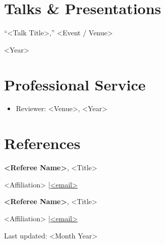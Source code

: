\documentclass[11pt,a4paper]{article}
\newcommand{\entry}[2]{%
  \noindent\begin{minipage}[t]{0.80\textwidth}#1\end{minipage}%
  \hfill\begin{minipage}[t]{0.19\textwidth}\raggedleft #2\end{minipage}\par}
\begin{document}
\section{Talks \& Presentations}
\entry{``<Talk Title>,'' <Event / Venue>}{<Year>}

\section{Professional Service}
\begin{itemize}
  \item Reviewer: <Venue>, <Year>
\end{itemize}

\section{References}
\entry{\textbf{<Referee Name>}, <Title>}{}
\noindent <Affiliation> \quad|\quad \href{mailto:<email>}{<email>}
\vspace{4pt}

\entry{\textbf{<Referee Name>}, <Title>}{}
\noindent <Affiliation> \quad|\quad \href{mailto:<email>}{<email>}

\vfill
\begin{center}\scriptsize Last updated: <Month Year>\end{center}
\end{document}
